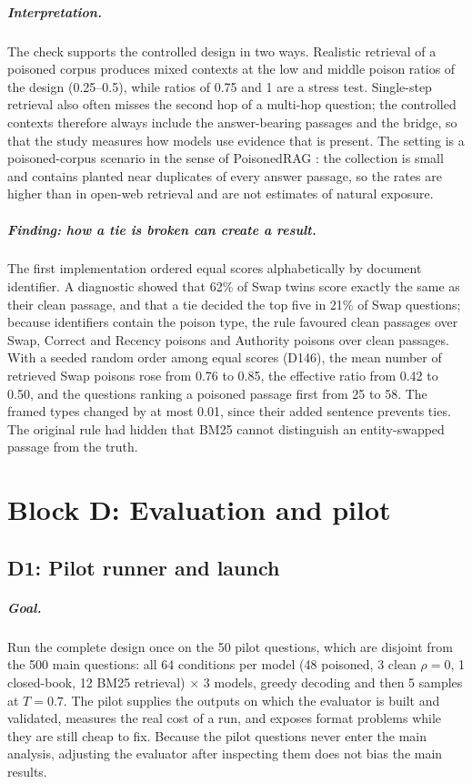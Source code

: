 \documentclass[11pt,a4paper]{report}
\begin{document}
\paragraph{Interpretation.}
The check supports the controlled design in two ways. Realistic retrieval of a
poisoned corpus produces mixed contexts at the low and middle poison ratios of
the design (0.25--0.5), while ratios of 0.75 and 1 are a stress test.
Single-step retrieval also often misses the second hop of a multi-hop question;
the controlled contexts therefore always include the answer-bearing passages and
the bridge, so that the study measures how models use evidence that is present.
The setting is a poisoned-corpus scenario in the sense of PoisonedRAG
\citep{zou2024poisonedrag}: the collection is small and contains planted near
duplicates of every answer passage, so the rates are higher than in open-web
retrieval and are not estimates of natural exposure.

\paragraph{Finding: how a tie is broken can create a result.}
The first implementation ordered equal scores alphabetically by document
identifier. A diagnostic showed that 62\% of Swap twins score exactly the same
as their clean passage, and that a tie decided the top five in 21\% of Swap
questions; because identifiers contain the poison type, the rule favoured clean
passages over Swap, Correct and Recency poisons and Authority poisons over clean
passages. With a seeded random order among equal scores (D146), the mean number
of retrieved Swap poisons rose from 0.76 to 0.85, the effective ratio from 0.42
to 0.50, and the questions ranking a poisoned passage first from 25 to 58. The
framed types changed by at most 0.01, since their added sentence prevents ties.
The original rule had hidden that BM25 cannot distinguish an entity-swapped
passage from the truth.


\chapter{Block D: Evaluation and pilot}
\label{ch:blockd}

\section{D1: Pilot runner and launch}

\paragraph{Goal.}
Run the complete design once on the 50 pilot questions, which are disjoint
from the 500 main questions: all 64 conditions per model (48 poisoned, 3
clean $\rho=0$, 1 closed-book, 12 BM25 retrieval) $\times$ 3 models, greedy
decoding and then 5 samples at $T=0.7$. The pilot supplies the outputs on
which the evaluator is built and validated, measures the real cost of a run,
and exposes format problems while they are still cheap to fix. Because the
pilot questions never enter the main analysis, adjusting the evaluator after
inspecting them does not bias the main results.
\end{document}
